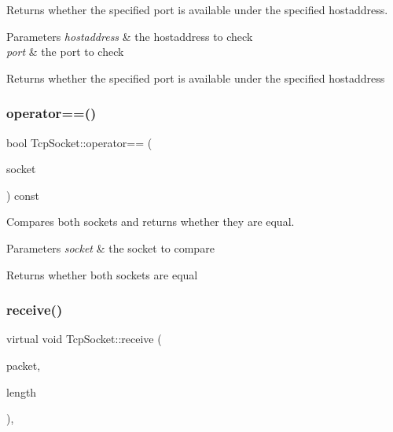 Returns whether the specified port is available under the specified hostaddress. 


\begin{DoxyParams}{Parameters}
{\em hostaddress} & the hostaddress to check \\
\hline
{\em port} & the port to check \\
\hline
\end{DoxyParams}
\begin{DoxyReturn}{Returns}
whether the specified port is available under the specified hostaddress 
\end{DoxyReturn}
\mbox{\label{class_tcp_socket_a282abf062b6536eaa57e8ef7fec7a122}} 
\subsubsection{\texorpdfstring{operator==()}{operator==()}}
{\footnotesize\ttfamily bool Tcp\+Socket\+::operator== (\begin{DoxyParamCaption}\item[{const \mbox{\hyperlink{class_tcp_socket}{Tcp\+Socket}} \&}]{socket }\end{DoxyParamCaption}) const}



Compares both sockets and returns whether they are equal. 


\begin{DoxyParams}{Parameters}
{\em socket} & the socket to compare \\
\hline
\end{DoxyParams}
\begin{DoxyReturn}{Returns}
whether both sockets are equal 
\end{DoxyReturn}
\mbox{\label{class_tcp_socket_a5c3aedf1e5387e02204d423e39dd6bee}} 
\subsubsection{\texorpdfstring{receive()}{receive()}}
{\footnotesize\ttfamily virtual void Tcp\+Socket\+::receive (\begin{DoxyParamCaption}\item[{const char $\ast$}]{packet,  }\item[{uint}]{length }\end{DoxyParamCaption})\hspace{0.3cm}{\ttfamily [inline]}, {\ttfamily [virtual]}}



